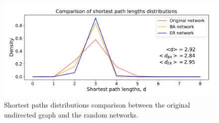 \documentclass[11pt, twoside]{report}
\begin{document}
    
    \begin{figure}[htbp]
      \centering
      \includegraphics[width=\textwidth]{../../scripts/network_analysis/imgs/paths_hist_comparison.pdf}            
      \caption{Shortest paths distributions comparison between the original undirected graph and the random networks.}
      \label{fig:path_comparison}
    \end{figure}
\end{document}
